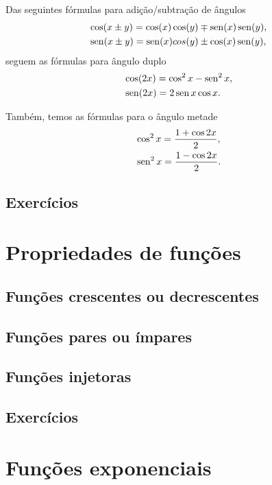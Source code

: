 Das seguintes fórmulas para adição/subtração de ângulos
\begin{align}
  &\cos(x\pm y) = \cos(x)\cos(y) \mp \operatorname{sen}(x)\operatorname{sen}(y),\\
  &\operatorname{sen}(x\pm y) = \operatorname{sen}(x)cos(y) \pm \cos(x)\operatorname{sen}(y),
\end{align}
seguem as fórmulas para ângulo duplo
\begin{align}
  &\cos(2x) = \cos^2x - \operatorname{sen}^2x,\\
  &\operatorname{sen}(2x) = 2\operatorname{sen} x\cos x.
\end{align}

Também, temos as fórmulas para o ângulo metade
\begin{align}
  &\cos^2 x = \frac{1 + \cos 2x}{2},\\
  &\operatorname{sen}^2 x = \frac{1 - \cos 2x}{2}.
\end{align}

\subsection*{Exercícios}

\emconstrucao

\section{Propriedades de funções}\label{cap_funcao_sec_prop}

\subsection{Funções crescentes ou decrescentes}

\emconstrucao

\subsection{Funções pares ou ímpares}

\emconstrucao

\subsection{Funções injetoras}

\emconstrucao

\subsection*{Exercícios}


\section{Funções exponenciais}\label{cap_funcao_sec_funexp}

